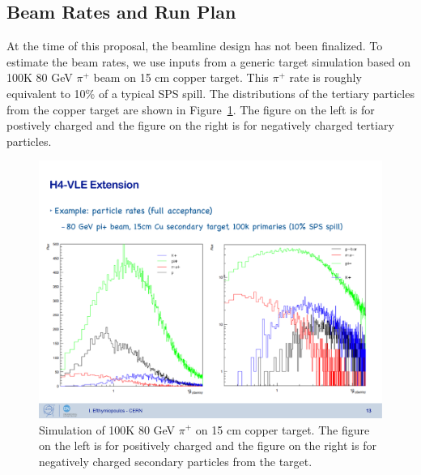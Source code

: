 

\subsection{Beam Rates and Run Plan}
At the time of this proposal, the beamline design has not been finalized. To estimate the beam rates, we use inputs from a generic target simulation based on 100K 80 GeV $\pi^+$ beam on 15 cm copper target. This $\pi^+$ rate is roughly equivalent to 10\% of a typical SPS spill. The distributions of the tertiary particles from the copper target are shown in Figure~\ref{fig:PionOnCuTarget}. The figure on the left is for postively charged and the figure on the right is for negatively charged tertiary particles. 

\begin{figure}[tbh]
  \centering
\includegraphics[scale=0.45]{figures/80GeVPion-15cmCuTarget.pdf}
  \caption{Simulation of 100K 80 GeV $\pi^+$ on 15 cm copper target. The figure on the left is for positively charged and the figure on the right is for negatively charged secondary particles from the target. }
\label{fig:PionOnCuTarget}
\end{figure}

